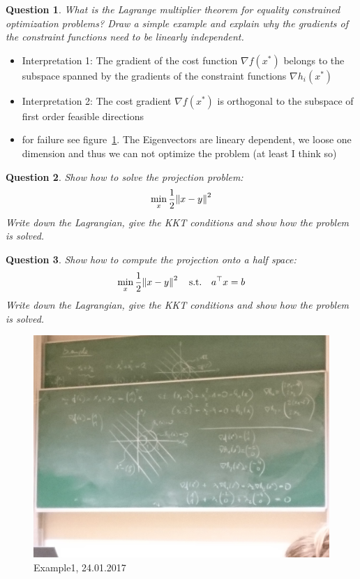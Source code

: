\documentclass{article}
\newtheorem{question}{Question}
\newcommand{\T}[1]{#1^{\top}}
\begin{document}
\begin{question}
  What is the Lagrange multiplier theorem for equality constrained optimization problems? Draw a
  simple example and explain why the gradients of the constraint functions need to be linearly
  independent.
\end{question}
\begin{itemize}
\item Interpretation 1: The gradient of the cost function $\nabla f (x^*)$
  belongs to the subspace spanned by the gradients of the
  constraint functions $\nabla h_i (x^* )$
\item Interpretation 2: The cost gradient $\nabla f (x^* )$ is orthogonal to
  the subspace of first order feasible directions
\item for failure see figure~\ref{fig:ex1}. The Eigenvectors are lineary dependent, we loose one
  dimension and thus we can not optimize the problem (at least I think so)
\end{itemize}

\begin{question}
  Show how to solve the projection problem:
  \[
    \min_x \frac{1}{2} \enVert{x - y}^2
  \]
  Write down the Lagrangian, give the KKT conditions and show how the
problem is solved.
\end{question}

\begin{question}
  Show how to compute the projection onto a half space:
  \[
    \min_x \frac{1}{2} \enVert{x-y}^2 \quad \text{s.t.} \quad \T{a}x = b
  \]
  Write down the Lagrangian, give the KKT conditions and show how the
  problem is solved.
\end{question}


\begin{figure}[H]
  \includegraphics[width=\textwidth]{2017_01_24-ex1.jpg}
  \caption{Example1,  24.01.2017\label{fig:ex1}}
\end{figure}
\end{document}
